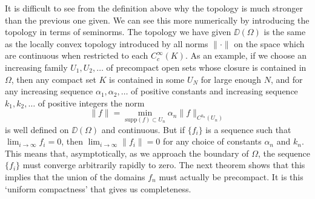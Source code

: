 It is difficult to see from the definition above why the topology is much stronger than the previous one given. We can see this more numerically by introducing the topology in terms of seminorms. The topology we have given $\DD(\Omega)$ is the same as the locally convex topology introduced by all norms $\| \cdot \|$ on the space which are continuous when restricted to each $C_c^\infty(K)$. As an example, if we choose an increasing family $U_1, U_2, \dots$ of precompact open sets whose closure is contained in $\Omega$, then any compact set $K$ is contained in some $U_N$ for large enough $N$, and for any increasing sequence $\alpha_1, \alpha_2, \dots$ of positive constants and increasing sequence $k_1, k_2, \dots$ of positive integers the norm
%
\[ \| f \| = \min_{\text{supp}(f) \subset U_n} \alpha_n \| f \|_{C^{k_n}(U_n)} \]
%
is well defined on $\DD(\Omega)$ and continuous. But if $\{ f_i \}$ is a sequence such that $\lim_{i \to \infty} f_i = 0$, then $\lim_{i \to \infty} \| f_i \| = 0$ for any choice of constants $\alpha_n$ and $k_n$. This means that, asymptotically, as we approach the boundary of $\Omega$, the sequence $\{ f_i \}$ must converge arbitrarily rapidly to zero. The next theorem shows that this implies that the union of the domains $f_n$ must actually be precompact. It is this `uniform compactness' that gives us completeness.

